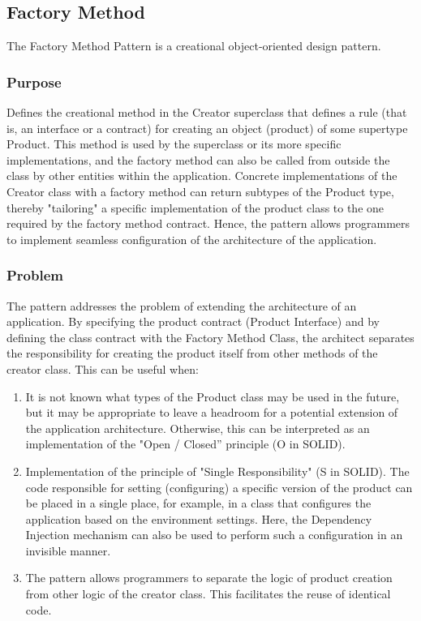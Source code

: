 \documentclass[sigplan,12pt,nonacm=true,review=false]{acmart}
\begin{document}
\subsection{Factory Method}
The Factory Method Pattern is a creational object-oriented design pattern.

\subsubsection{Purpose}
Defines the creational method in the Creator superclass that defines a rule (that is, an interface or a contract) for creating an object (product) of some supertype Product. This method is used by the superclass or its more specific implementations, and the factory method can also be called from outside the class by other entities within the application. Concrete implementations of the Creator class with a factory method can return subtypes of the Product type, thereby "tailoring" a specific implementation of the product class to the one required by the factory method contract. Hence, the pattern allows programmers to implement seamless configuration of the architecture of the application.

\subsubsection{Problem}
The pattern addresses the problem of extending the architecture of an application. By specifying  the product contract (Product Interface) and by defining the class contract with the Factory Method Class, the architect separates the responsibility for creating the product itself from other methods of the creator class. This can be useful when:
\begin{enumerate}
    \item It is not known what types of the Product class may be used in the future, but it may be appropriate to leave a headroom for a potential extension of the application architecture. Otherwise, this can be interpreted as an implementation of the "Open / Closed” principle (O in SOLID).
    \item Implementation of the principle of "Single Responsibility" (S in SOLID). The code responsible for setting (configuring) a specific version of the product can be placed in a single place, for example, in a class that configures the application based on the environment settings. Here, the Dependency Injection mechanism can also be used to perform such a configuration in an invisible manner.
    \item The pattern allows programmers to separate the logic of product creation from other logic of the creator class. This facilitates the reuse of identical code.
\end{enumerate}
\end{document}
